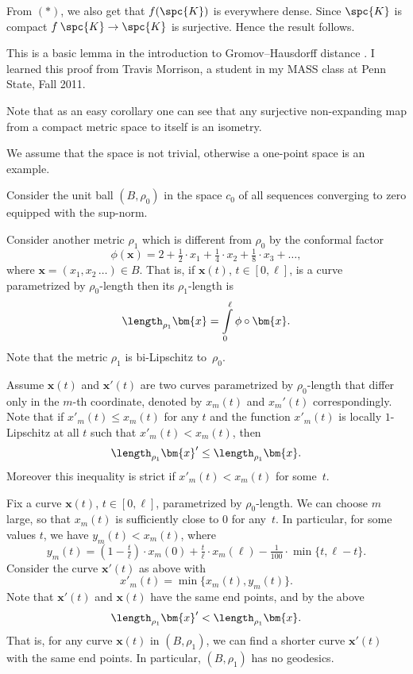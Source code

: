 From $({*})$, we also get that $f(\spc{K})$ is everywhere dense.
Since $\spc{K}$ is compact $f\:\spc{K}\to \spc{K}$ is surjective. Hence the result follows.\qeds


This is a basic lemma in the introduction to Gromov--Hausdorff distance \cite[see 7.3.30 in][]{burago-burago-ivanov}.
I learned this proof from Travis Morrison, 
a student in my MASS class at Penn State, Fall 2011.

Note that as an easy corollary one can see that any surjective non-expanding map from a compact metric space to itself is an isometry.




We assume that the space is not trivial, otherwise a one-point space is an example.

Consider the unit ball $(B,\rho_0)$
in the space $c_0$ of all sequences converging to zero equipped with the sup-norm.

Consider another metric $\rho_1$ which is different from $\rho_0$ by the conformal factor
\[\phi(\bm{x})=2+\tfrac{1}2\cdot x_1+\tfrac{1}4\cdot x_2+\tfrac{1}8\cdot x_3+\dots,\]
where $\bm{x}=(x_1,x_2\,\dots)\in B$.
That is, if $\bm{x}(t)$, $t\in[0,\ell]$, is a curve parametrized by $\rho_0$-length 
then its $\rho_1$-length is 
\[\length_{\rho_1}\bm{x}=\int\limits_0^\ell\phi\circ\bm{x}.\]
Note that the metric $\rho_1$ is bi-Lipschitz to~$\rho_0$.

Assume $\bm{x}(t)$ and $\bm{x}'(t)$ are two curves parametrized by $\rho_0$-length that differ only in the $m$-th coordinate, denoted by $x_m(t)$ and $x_m'(t)$ correspondingly.
Note that if $x'_m(t)\le x_m(t)$ for any $t$ and 
the function $x'_m(t)$ is locally $1$-Lipschitz at all $t$ such that $x'_m(t)< x_m(t)$, then 
\[\length_{\rho_1}\bm{x}'\le \length_{\rho_1}\bm{x}.\]
Moreover this inequality is strict if $x'_m(t)< x_m(t)$ for some~$t$.

Fix a curve $\bm{x}(t)$, $t\in[0,\ell]$, parametrized by  $\rho_0$-length.
We can choose $m$ large, so that $x_m(t)$ is sufficiently close to $0$ for any~$t$.
In particular, for some values $t$, we have $y_m(t)<x_m(t)$, where
\[y_m(t)=(1-\tfrac t\ell)\cdot x_m(0)
+\tfrac t\ell\cdot x_m(\ell)
-\tfrac 1{100}\cdot \min\{t,\ell-t\}.\]
Consider the curve $\bm{x}'(t)$ as above with
\[x'_m(t)=\min\{x_m(t),y_m(t)\}.\]
Note that $\bm{x}'(t)$ and $\bm{x}(t)$ have the same end points, and by the above
\[\length_{\rho_1}\bm{x}'<\length_{\rho_1}\bm{x}.\]
That is, for any curve $\bm{x}(t)$ in $(B,\rho_1)$, we can find a shorter curve $\bm{x}'(t)$ with the same end points.
In particular, $(B,\rho_1)$ has no geodesics.\qeds

